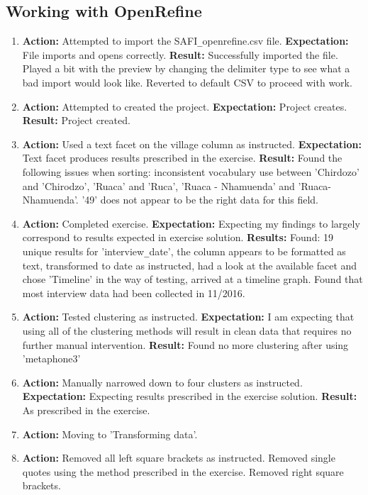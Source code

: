 \documentclass{article}
\begin{document}
\subsection{Working with OpenRefine}
\begin{enumerate}
    \item \textbf{Action: }Attempted to import the SAFI\verb|_|openrefine.csv file.
    \subitem \textbf{Expectation: } File imports and opens correctly.
    \subitem \textbf{Result: }Successfully imported the file. Played a bit with the preview by changing the delimiter type to see what a bad import would look like. Reverted to default CSV to proceed with work.
    \item \textbf{Action: }Attempted to created the project.
    \subitem \textbf{Expectation: }Project creates.
    \subitem \textbf{Result: }Project created.
    \item \textbf{Action: }Used a text facet on the village column as instructed. 
    \subitem \textbf{Expectation: }Text facet produces results prescribed in the exercise.
    \subitem \textbf{Result: }Found the following issues when sorting: inconsistent vocabulary use between 'Chirdozo' and 'Chirodzo', 'Ruaca' and 'Ruca', 'Ruaca - Nhamuenda' and 'Ruaca-Nhamuenda'. '49' does not appear to be the right data for this field.
    \item \textbf{Action: }Completed exercise.
    \subitem \textbf{Expectation: }Expecting my findings to largely correspond to results expected in exercise solution.
    \subitem \textbf{Results: } Found: 19 unique results for 'interview\verb|_|date', the column appears to be formatted as text, transformed to date as instructed, had a look at the available facet and chose 'Timeline' in the way of testing, arrived at a timeline graph. Found that most interview data had been collected in 11/2016.
    \item \textbf{Action: }Tested clustering as instructed. 
    \subitem \textbf{Expectation: }I am expecting that using all of the clustering methods will result in clean data that requires no further manual intervention.
    \subitem \textbf{Result: }Found no more clustering after using 'metaphone3'
    \item \textbf{Action: }Manually narrowed down to four clusters as instructed.
    \subitem \textbf{Expectation: }Expecting results prescribed in the exercise solution.
    \subitem \textbf{Result: }As prescribed in the exercise.
    \item \textbf{Action: }Moving to 'Transforming data'. 
    \item \textbf{Action: }Removed all left square brackets as instructed. Removed single quotes using the method prescribed in the exercise. Removed right square brackets.

\end{enumerate}
\end{document}
